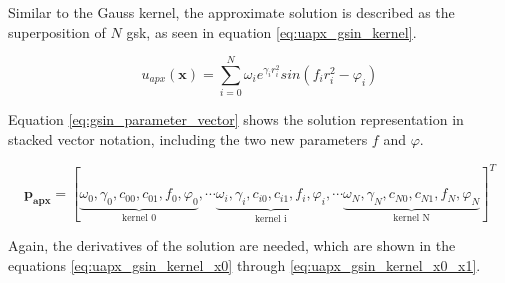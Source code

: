 \documentclass[./\jobname.tex]{subfiles}
\begin{document}
\begin{figure}[H]
	\centering
	\noindent{}
	\label{fig:gsin_kernel_3d_plot}
\end{figure}

Similar to the Gauss kernel, the approximate solution is described as the superposition of $N$ \gls{gsk}, as seen in equation \eqref{eq:uapx_gsin_kernel}. 

\begin{equation}
\label{eq:uapx_gsin_kernel}
u_{apx}(\mathbf{x}) = \sum_{i=0}^{N} \omega_i e^{\gamma_i r_i^2} sin(f_i r_i^2 - \varphi_i)
\end{equation}

Equation \eqref{eq:gsin_parameter_vector} shows the solution representation in stacked vector notation, including the two new parameters $f$ and $\varphi$. 

\begin{equation}
\label{eq:gsin_parameter_vector}
\mathbf{p_{apx}} = \left[\underbrace{\omega_0, \gamma_0, c_{00}, c_{01}, f_0, \varphi_0}_{\text{kernel 0}}, \cdots \underbrace{\omega_i, \gamma_i, c_{i0}, c_{i1}, f_i, \varphi_i}_{\text{kernel i}}, \cdots \underbrace{\omega_N, \gamma_N, c_{N0}, c_{N1}, f_N, \varphi_N}_{\text{kernel N}} \right]^T
\end{equation}

Again, the derivatives of the solution are needed, which are shown in the equations \eqref{eq:uapx_gsin_kernel_x0} through \eqref{eq:uapx_gsin_kernel_x0_x1}. 
\end{document}
